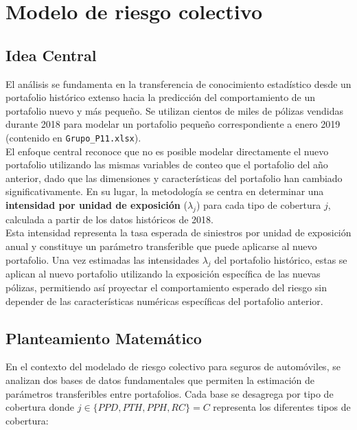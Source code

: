 \section{Modelo de riesgo colectivo}

\subsection{Idea Central}

El análisis se fundamenta en la transferencia de conocimiento estadístico desde un portafolio histórico extenso hacia la predicción del comportamiento de un portafolio nuevo y más pequeño. Se utilizan cientos de miles de pólizas vendidas durante 2018 para modelar un portafolio pequeño correspondiente a enero 2019 (contenido en \texttt{Grupo\_P11.xlsx}).\\

El enfoque central reconoce que no es posible modelar directamente el nuevo portafolio utilizando las mismas variables de conteo que el portafolio del año anterior, dado que las dimensiones y características del portafolio han cambiado significativamente. En su lugar, la metodología se centra en determinar una \textbf{intensidad por unidad de exposición} ($\lambda_j$) para cada tipo de cobertura $j$, calculada a partir de los datos históricos de 2018.\\

Esta intensidad representa la tasa esperada de siniestros por unidad de exposición anual y constituye un parámetro transferible que puede aplicarse al nuevo portafolio. Una vez estimadas las intensidades $\lambda_j$ del portafolio histórico, estas se aplican al nuevo portafolio utilizando la exposición específica de las nuevas pólizas, permitiendo así proyectar el comportamiento esperado del riesgo sin depender de las características numéricas específicas del portafolio anterior.\\

\subsection{Planteamiento Matemático}

En el contexto del modelado de riesgo colectivo para seguros de automóviles, se analizan dos bases de datos fundamentales que permiten la estimación de parámetros transferibles entre portafolios. Cada base se desagrega por tipo de cobertura donde $j \in \{PPD, PTH, PPH, RC\} = C$ representa los diferentes tipos de cobertura:


